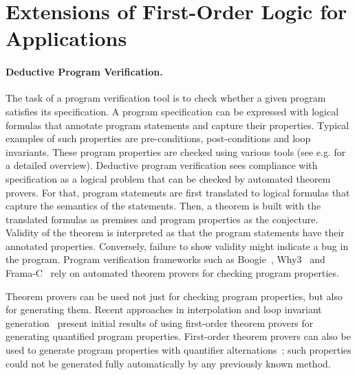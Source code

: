 \section*{Extensions of First-Order Logic for Applications}


\paragraph{Deductive Program Verification.}
The task of a program verification tool is to check whether a given program satisfies its specification. A program specification can be expressed with logical formulas that annotate program statements and capture their properties. Typical examples of such properties are pre-conditions, post-conditions and loop invariants. These program properties are checked using various tools (see e.g. \cite{Bonacina10} for a detailed overview). Deductive program verification sees compliance with specification as a logical problem that can be checked by automated theorem provers. For that, program statements are first translated to logical formulas that capture the semantics of the statements. Then, a theorem is built with the translated formulas as premises and program properties as the conjecture. Validity of the theorem is interpreted as that the program statements have their annotated properties. Conversely, failure to show validity might indicate a bug in the program. Program verification frameworks such as Boogie~\cite{DBLP:conf/fmco/BarnettCDJL05}, Why3~\cite{DBLP:conf/esop/FilliatreP13} and Frama-C~\cite{FramaC} rely on automated theorem provers for checking program properties.

Theorem provers can be used not just for checking program properties, but also for generating them. Recent approaches in interpolation and loop invariant generation~\cite{McMillan08,fase2009,hoder2012popl} present initial results of using first-order theorem provers for generating quantified program properties. First-order theorem provers can also be used to generate program properties with quantifier alternations~\cite{fase2009}; such properties could not be generated fully automatically by any previously known method.

